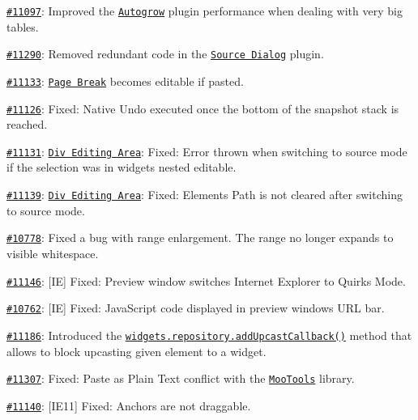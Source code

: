 {\begin{DoxyItemize}
\item \href{http://dev.ckeditor.com/ticket/11097}{\tt \#11097}\+: Improved the \href{http://ckeditor.com/addon/autogrow}{\tt Autogrow} plugin performance when dealing with very big tables.
\item \href{http://dev.ckeditor.com/ticket/11290}{\tt \#11290}\+: Removed redundant code in the \href{http://ckeditor.com/addon/sourcedialog}{\tt Source Dialog} plugin.
\item \href{http://dev.ckeditor.com/ticket/11133}{\tt \#11133}\+: \href{http://ckeditor.com/addon/pagebreak}{\tt Page Break} becomes editable if pasted.
\item \href{http://dev.ckeditor.com/ticket/11126}{\tt \#11126}\+: Fixed\+: Native Undo executed once the bottom of the snapshot stack is reached.
\item \href{http://dev.ckeditor.com/ticket/11131}{\tt \#11131}\+: \href{http://ckeditor.com/addon/divarea}{\tt Div Editing Area}\+: Fixed\+: Error thrown when switching to source mode if the selection was in widget\textquotesingle{}s nested editable.
\item \href{http://dev.ckeditor.com/ticket/11139}{\tt \#11139}\+: \href{http://ckeditor.com/addon/divarea}{\tt Div Editing Area}\+: Fixed\+: Elements Path is not cleared after switching to source mode.
\item \href{http://dev.ckeditor.com/ticket/10778}{\tt \#10778}\+: Fixed a bug with range enlargement. The range no longer expands to visible whitespace.
\item \href{http://dev.ckeditor.com/ticket/11146}{\tt \#11146}\+: \mbox{[}IE\mbox{]} Fixed\+: Preview window switches Internet Explorer to Quirks Mode.
\item \href{http://dev.ckeditor.com/ticket/10762}{\tt \#10762}\+: \mbox{[}IE\mbox{]} Fixed\+: Java\+Script code displayed in preview window\textquotesingle{}s U\+RL bar.
\item \href{http://dev.ckeditor.com/ticket/11186}{\tt \#11186}\+: Introduced the \href{http://docs.ckeditor.com/#!/api/CKEDITOR.plugins.widget.repository-method-addUpcastCallback}{\tt {\ttfamily widgets.\+repository.\+add\+Upcast\+Callback()}} method that allows to block upcasting given element to a widget.
\item \href{http://dev.ckeditor.com/ticket/11307}{\tt \#11307}\+: Fixed\+: Paste as Plain Text conflict with the \href{http://mootools.net}{\tt Moo\+Tools} library.
\item \href{http://dev.ckeditor.com/ticket/11140}{\tt \#11140}\+: \mbox{[}I\+E11\mbox{]} Fixed\+: Anchors are not draggable.

\end{DoxyItemize}}
